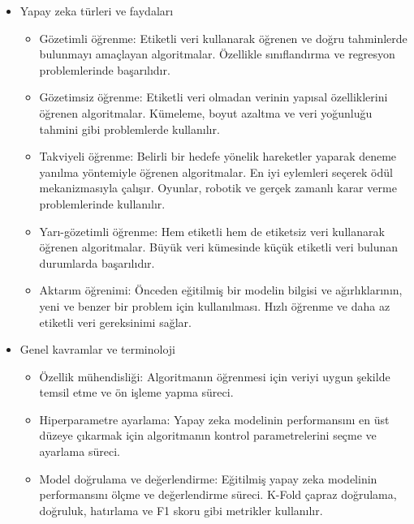 \documentclass[12pt]{article}
\begin{document}
\begin{enumerate}
\begin{itemize}
\begin{itemize}
        \end{itemize}
        \item Yapay zeka türleri ve faydaları
        \begin{itemize}
            \item Gözetimli öğrenme: Etiketli veri kullanarak öğrenen ve doğru tahminlerde bulunmayı amaçlayan algoritmalar. Özellikle sınıflandırma ve regresyon problemlerinde başarılıdır.
            \item Gözetimsiz öğrenme: Etiketli veri olmadan verinin yapısal özelliklerini öğrenen algoritmalar. Kümeleme, boyut azaltma ve veri yoğunluğu tahmini gibi problemlerde kullanılır.
            \item Takviyeli öğrenme: Belirli bir hedefe yönelik hareketler yaparak deneme yanılma yöntemiyle öğrenen algoritmalar. En iyi eylemleri seçerek ödül mekanizmasıyla çalışır. Oyunlar, robotik ve gerçek zamanlı karar verme problemlerinde kullanılır.
            \item Yarı-gözetimli öğrenme: Hem etiketli hem de etiketsiz veri kullanarak öğrenen algoritmalar. Büyük veri kümesinde küçük etiketli veri bulunan durumlarda başarılıdır.
            \item Aktarım öğrenimi: Önceden eğitilmiş bir modelin bilgisi ve ağırlıklarının, yeni ve benzer bir problem için kullanılması. Hızlı öğrenme ve daha az etiketli veri gereksinimi sağlar.
        \end{itemize}
        \item Genel kavramlar ve terminoloji
        \begin{itemize}
            \item Özellik mühendisliği: Algoritmanın öğrenmesi için veriyi uygun şekilde temsil etme ve ön işleme yapma süreci.
            \item Hiperparametre ayarlama: Yapay zeka modelinin performansını en üst düzeye çıkarmak için algoritmanın kontrol parametrelerini seçme ve ayarlama süreci.
            \item Model doğrulama ve değerlendirme: Eğitilmiş yapay zeka modelinin performansını ölçme ve değerlendirme süreci. K-Fold çapraz doğrulama, doğruluk, hatırlama ve F1 skoru gibi metrikler kullanılır.
        \end{itemize}
    \end{itemize}



\end{enumerate}
\end{document}
